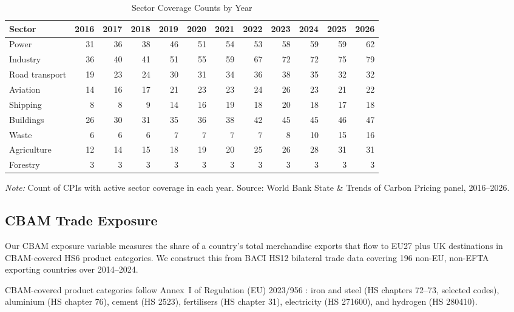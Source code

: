 \documentclass[12pt,a4paper]{article}
\begin{document}
\begin{table}[htbp]
\centering
\begin{threeparttable}
\caption{Sector Coverage Counts by Year}\label{tab:descriptive}
\small
\begin{tabular}{lrrrrrrrrrrr}
\toprule
Sector & 2016 & 2017 & 2018 & 2019 & 2020 & 2021 & 2022 & 2023 & 2024 & 2025 & 2026 \\
\midrule
Power & 31 & 36 & 38 & 46 & 51 & 54 & 53 & 58 & 59 & 59 & 62 \\
Industry & 36 & 40 & 41 & 51 & 55 & 59 & 67 & 72 & 72 & 75 & 79 \\
Road transport & 19 & 23 & 24 & 30 & 31 & 34 & 36 & 38 & 35 & 32 & 32 \\
Aviation & 14 & 16 & 17 & 21 & 23 & 23 & 24 & 26 & 23 & 21 & 22 \\
Shipping & 8 & 8 & 9 & 14 & 16 & 19 & 18 & 20 & 18 & 17 & 18 \\
Buildings & 26 & 30 & 31 & 35 & 36 & 38 & 42 & 45 & 45 & 46 & 47 \\
Waste & 6 & 6 & 6 & 7 & 7 & 7 & 7 & 8 & 10 & 15 & 16 \\
Agriculture & 12 & 14 & 15 & 18 & 19 & 20 & 25 & 26 & 28 & 31 & 31 \\
Forestry & 3 & 3 & 3 & 3 & 3 & 3 & 3 & 3 & 3 & 3 & 3 \\
\bottomrule
\end{tabular}
\begin{tablenotes}\small
\item \textit{Note:} Count of CPIs with active sector coverage in each year. Source: World Bank State \& Trends of Carbon Pricing panel, 2016--2026.
\end{tablenotes}
\end{threeparttable}
\end{table}

\subsection{CBAM Trade Exposure}\label{sec:exposure}

Our CBAM exposure variable measures the share of a country's total merchandise exports that flow to EU27 plus UK destinations in CBAM-covered HS6 product categories. We construct this from BACI HS12 bilateral trade data \citep{Gaulier2010} covering 196 non-EU, non-EFTA exporting countries over 2014--2024.

CBAM-covered product categories follow Annex~I of Regulation (EU) 2023/956 \citep{CBAM2023}: iron and steel (HS chapters 72--73, selected codes), aluminium (HS chapter 76), cement (HS 2523), fertilisers (HS chapter 31), electricity (HS 271600), and hydrogen (HS 280410).
\end{document}

